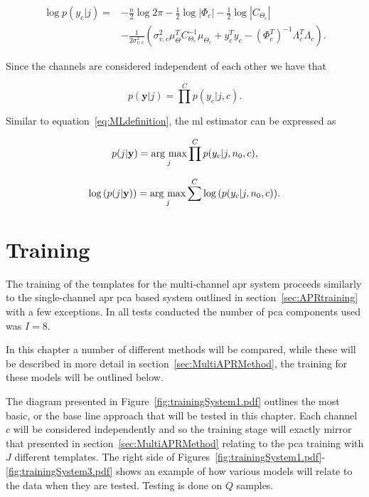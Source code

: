 \begin{equation}\label{eq:loglikeli_c}\begin{split}
\log{p(y_c|j)} = &- \frac{n}{2}\log{2 \pi}- \frac{1}{2}\log{|\Phi_c|} - \frac{1}{2}\log{|C_{\Theta_c}|} \\
& -\frac{1}{2\sigma^2_{v,c}}\left(\sigma_{v,c}^2\mu_\Theta^TC_{\Theta_c}^{-1}\mu_{\Theta_c} + y_c^Ty_c- \left(\Phi_c^T\right)^{-1}\Lambda_c^T\Lambda_c\right).
\end{split}\end{equation}

Since the channels are considered independent of each other we have that

\begin{equation}\label{eq:jointprob_c}
p(\textbf{y} | j) = \prod^C p(y_c | j, c).
\end{equation}

Similar to equation~\ref{eq:MLdefinition}, the \gls{ml} estimator can be expressed as

\begin{equation}\label{eq:MLdefinition_c}
p(j |\textbf{y}) = \underset{j}{\mathrm{arg~max}} \prod^C p(y_c|j,n_0,c),
\end{equation}

\begin{equation}\label{eq:MLdefinition2_c}
\log{\left( p(j |\textbf{y})\right)} = \underset{j}{\mathrm{arg~max}} \sum^C \log{\left( p(y_c|j,n_0,c) \right)}.
\end{equation}

\section{Training}\label{sec:MultiAPRTraining}
The training of the templates for the multi-channel \gls{apr} system proceeds similarly to the single-channel \gls{apr} \gls{pca} based system outlined in section~\ref{sec:APRtraining} with a few exceptions. In all tests conducted the number of \gls{pca} components used was $I = 8$.

In this chapter a number of different methods will be compared, while these will be described in more detail in section~\ref{sec:MultiAPRMethod}, the training for these models will be outlined below.

The diagram presented in Figure~\ref{fig:trainingSystem1.pdf} outlines the most basic, or the base line approach that will be tested in this chapter. Each channel $c$ will be considered independently and so the training stage will exactly mirror that presented in section~\ref{sec:MultiAPRMethod} relating to the \gls{pca} training with $J$ different templates. The right side of Figures~\ref{fig:trainingSystem1.pdf}-\ref{fig:trainingSystem3.pdf} shows an example of how various models will relate to the data when they are tested. Testing is done on $Q$ samples.

